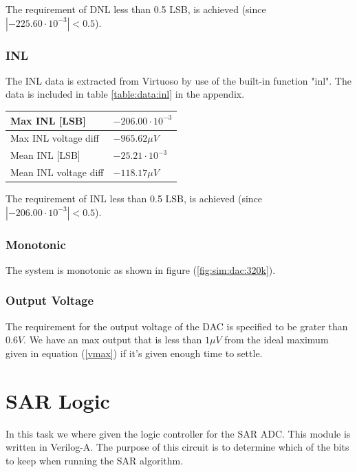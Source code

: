 \documentclass[english, 12pt, a4paper]{ifimaster}
\begin{document}
\hfill \break
\noindent 
The requirement of DNL less than 0.5 LSB, is achieved (since \(|-225.60 \cdot 10^{-3}|  < 0.5 \)).
 

\subsubsection{INL}
The INL data is extracted from Virtuoso by use of the built-in function "inl". 
The data is included in table \ref{table:data:inl} in the appendix.

\begin{tabular}[t]{|l|l|}
 \hline 
  
Max INL [LSB] & \(-206.00 \cdot 10^{-3} \) \\ \hline
Max INL voltage diff & \(-965.62 \mu V \) \\ \hline

Mean INL [LSB] & \(-25.21 \cdot 10^{-3} \) \\ \hline
Mean INL voltage diff & \( -118.17 \mu V \) \\ \hline
\end{tabular}

\hfill \break
\noindent 
The requirement of INL less than 0.5 LSB, is achieved (since \(|-206.00 \cdot 10^{-3}|  < 0.5 \)).

\subsubsection{Monotonic}
The system is monotonic as shown in figure (\ref{fig:sim:dac:320k}).


\subsubsection{Output Voltage}
The requirement for the output voltage of the DAC is specified to be grater than \(0.6 V\). 
We have an max output that is less than \(1\mu V\) from the ideal maximum given in equation (\ref{vmax}) if it's given enough time to settle.





\section{SAR Logic}
In this task we where given the logic controller for the SAR ADC. This module is written in Verilog-A. 
The purpose of this circuit is to determine which of the bits to keep when running the SAR algorithm.
\end{document}
